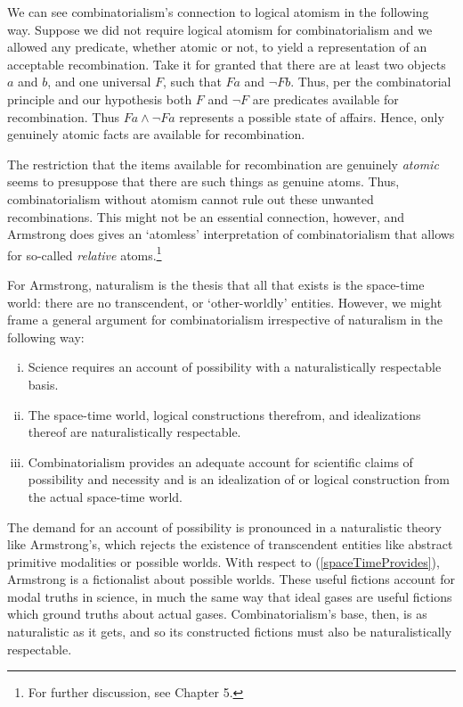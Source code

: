 We can see combinatorialism's connection to logical atomism in the following way. Suppose we did not require logical atomism for combinatorialism and we allowed any predicate, whether atomic or not, to yield a representation of an acceptable recombination.  Take it for granted that there are at least two objects $a$ and $b$, and one universal $F$, such that $Fa$ and $\neg Fb$. Thus, per the combinatorial principle and our hypothesis both $F$ and $\neg F$ are predicates available for recombination. Thus $Fa \wedge\neg Fa$ represents a possible state of affairs. Hence, only genuinely atomic facts are available for recombination.

The restriction that the items available for recombination are genuinely \emph{atomic} seems to presuppose that there are such things as genuine atoms. Thus, combinatorialism without atomism cannot rule out these unwanted recombinations. This might not be an essential connection, however, and Armstrong does gives an `atomless' interpretation of combinatorialism that allows for so-called \emph{relative} atoms.\footnote{For further discussion, see Chapter 5.}

For Armstrong, naturalism is the thesis that all that exists is the space-time world: there are no transcendent, or `other-worldly' entities. However, we might frame a general argument for combinatorialism irrespective of naturalism in the following way:

\begin{enumerate}[(i)]
\item\label{scienceNeeds} Science requires an account of possibility with a naturalistically respectable basis.
\item\label{spaceTimeProvides} The space-time world, logical constructions therefrom, and idealizations thereof are naturalistically respectable.
\item\label{combinatorialismIs} Combinatorialism provides an adequate account for scientific claims of possibility and necessity and is an idealization of or logical construction from the actual space-time world.
\end{enumerate}

The demand for an account of possibility is pronounced in a naturalistic theory like Armstrong's, which rejects the existence of transcendent entities like abstract primitive modalities or possible worlds. With respect to (\ref{spaceTimeProvides}), Armstrong is a fictionalist about possible worlds. These useful fictions account for modal truths in science, in much the same way that ideal gases are useful fictions which ground truths about actual gases. Combinatorialism's base, then, is as naturalistic as it gets, and so its constructed fictions must also be naturalistically respectable. 

